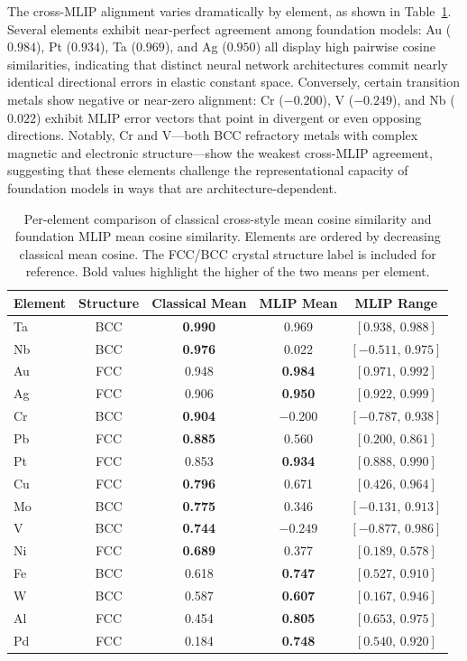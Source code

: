 \documentclass[twocolumn,9pt]{extarticle}
\begin{document}
The cross-MLIP alignment varies dramatically by element, as shown in Table~\ref{tab:foundation_classical_comparison}. Several elements exhibit near-perfect agreement among foundation models: Au ($0.984$), Pt ($0.934$), Ta ($0.969$), and Ag ($0.950$) all display high pairwise cosine similarities, indicating that distinct neural network architectures commit nearly identical directional errors in elastic constant space. Conversely, certain transition metals show negative or near-zero alignment: Cr ($-0.200$), V ($-0.249$), and Nb ($0.022$) exhibit MLIP error vectors that point in divergent or even opposing directions. Notably, Cr and V---both BCC refractory metals with complex magnetic and electronic structure---show the weakest cross-MLIP agreement, suggesting that these elements challenge the representational capacity of foundation models in ways that are architecture-dependent.

\begin{table}[htbp]
\centering
\caption{Per-element comparison of classical cross-style mean cosine similarity and foundation MLIP mean cosine similarity. Elements are ordered by decreasing classical mean cosine. The FCC/BCC crystal structure label is included for reference. Bold values highlight the higher of the two means per element.}
\label{tab:foundation_classical_comparison}
\begin{tabular}{lcccc}
\toprule
Element & Structure & Classical Mean & MLIP Mean & MLIP Range \\
\midrule
Ta & BCC & \textbf{0.990} & 0.969 & $[0.938,\,0.988]$ \\
Nb & BCC & \textbf{0.976} & 0.022 & $[-0.511,\,0.975]$ \\
Au & FCC & 0.948 & \textbf{0.984} & $[0.971,\,0.992]$ \\
Ag & FCC & 0.906 & \textbf{0.950} & $[0.922,\,0.999]$ \\
Cr & BCC & \textbf{0.904} & $-0.200$ & $[-0.787,\,0.938]$ \\
Pb & FCC & \textbf{0.885} & 0.560 & $[0.200,\,0.861]$ \\
Pt & FCC & 0.853 & \textbf{0.934} & $[0.888,\,0.990]$ \\
Cu & FCC & \textbf{0.796} & 0.671 & $[0.426,\,0.964]$ \\
Mo & BCC & \textbf{0.775} & 0.346 & $[-0.131,\,0.913]$ \\
V & BCC & \textbf{0.744} & $-0.249$ & $[-0.877,\,0.986]$ \\
Ni & FCC & \textbf{0.689} & 0.377 & $[0.189,\,0.578]$ \\
Fe & BCC & 0.618 & \textbf{0.747} & $[0.527,\,0.910]$ \\
W & BCC & 0.587 & \textbf{0.607} & $[0.167,\,0.946]$ \\
Al & FCC & 0.454 & \textbf{0.805} & $[0.653,\,0.975]$ \\
Pd & FCC & 0.184 & \textbf{0.748} & $[0.540,\,0.920]$ \\
\bottomrule
\end{tabular}
\end{table}
\end{document}
